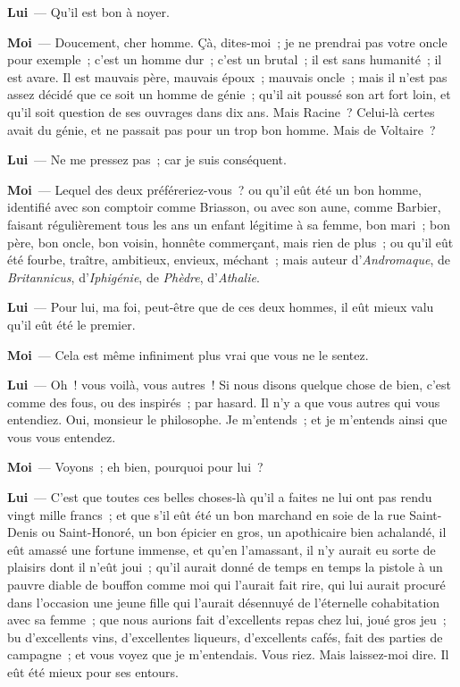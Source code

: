 \documentclass[french,twoside]{book} %
\newcommand{\labelchar}[1]{\textbf{\color{rubric} #1}}
\begin{document}
\labelchar{Lui} — Qu’il est bon à noyer.\par
\labelchar{Moi} — Doucement, cher homme. Çà, dites-moi ; je ne prendrai pas votre oncle pour exemple ; c’est un homme dur ; c’est un brutal ; il est sans humanité ; il est avare. Il est mauvais père, mauvais époux ; mauvais oncle ; mais il n’est pas assez décidé que ce soit un homme de génie ; qu’il ait poussé son art fort loin, et qu’il soit question de ses ouvrages dans dix ans. Mais Racine ? Celui-là certes avait du génie, et ne passait pas pour un trop bon homme. Mais de Voltaire ?\par
\labelchar{Lui} — Ne me pressez pas ; car je suis conséquent.\par
\labelchar{Moi} — Lequel des deux préféreriez-vous ? ou qu’il eût été un bon homme, identifié avec son comptoir comme Briasson, ou avec son aune, comme Barbier, faisant régulièrement tous les ans un enfant légitime à sa femme, bon mari ; bon père, bon oncle, bon voisin, honnête commerçant, mais rien de plus ; ou qu’il eût été fourbe, traître, ambitieux, envieux, méchant ; mais auteur d’\emph{Andromaque}, de \emph{Britannicus}, d’\emph{Iphigénie}, de \emph{Phèdre}, d’\emph{Athalie}.\par
\labelchar{Lui} — Pour lui, ma foi, peut-être que de ces deux hommes, il eût mieux valu qu’il eût été le premier.\par
\labelchar{Moi} — Cela est même infiniment plus vrai que vous ne le sentez.\par
\labelchar{Lui} — Oh ! vous voilà, vous autres ! Si nous disons quelque chose de bien, c’est comme des fous, ou des inspirés ; par hasard. Il n’y a que vous autres qui vous entendiez. Oui, monsieur le philosophe. Je m’entends ; et je m’entends ainsi que vous vous entendez.\par
\labelchar{Moi} — Voyons ; eh bien, pourquoi pour lui ?\par
\labelchar{Lui} — C’est que toutes ces belles choses-là qu’il a faites ne lui ont pas rendu vingt mille francs ; et que s’il eût été un bon marchand en soie de la rue Saint-Denis ou Saint-Honoré, un bon épicier en gros, un apothicaire bien achalandé, il eût amassé une fortune immense, et qu’en l’amassant, il n’y aurait eu sorte de plaisirs dont il n’eût joui ; qu’il aurait donné de temps en temps la pistole à un pauvre diable de bouffon comme moi qui l’aurait fait rire, qui lui aurait procuré dans l’occasion une jeune fille qui l’aurait désennuyé de l’éternelle cohabitation avec sa femme ; que nous aurions fait d’excellents repas chez lui, joué gros jeu ; bu d’excellents vins, d’excellentes liqueurs, d’excellents cafés, fait des parties de campagne ; et vous voyez que je m’entendais. Vous riez. Mais laissez-moi dire. Il eût été mieux pour ses entours.\par
\end{document}
